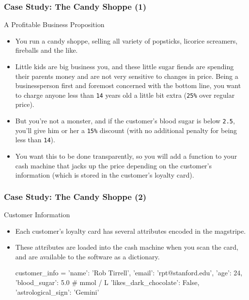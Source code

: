 \documentclass[10pt]{beamer}
\begin{document}
\begin{frame}
  \frametitle{Case Study: The Candy Shoppe (1)}
  \begin{block}{A Profitable Business Proposition}
    \begin{itemize}
      \item You run a candy shoppe, selling all variety of popsticks, licorice screamers, fireballs and the like.
      \item Little kids are big business you, and these little sugar fiends are spending their parents money and are not very sensitive to changes in price.
        Being a businessperson first and foremost concerned with the bottom line, you want to charge anyone less than \texttt{14} years old a little bit extra (\texttt{25\%} over regular price).
      \item But you're not a monster, and if the customer's blood sugar is below \texttt{2.5}, you'll give him or her a \texttt{15\%} discount (with no additional penalty for being less than \texttt{14}).
      \item You want this to be done transparently, so you will add a function to your cash machine that jacks up the price depending on the customer's information (which is stored in the customer's loyalty card).
    \end{itemize}
  \end{block}
\end{frame}

\begin{frame}[fragile]
  \frametitle{Case Study: The Candy Shoppe (2)}
  \begin{block}{Customer Information}
    \begin{itemize}
      \item Each customer's loyalty card has several attributes encoded in the magstripe.
      \item These attributes are loaded into the cash machine when you scan the card, and are available to the software as a dictionary.
        \begin{pythoncode}
  customer_info = {
    'name': 'Rob Tirrell',
    'email': 'rpt@stanford.edu',
    'age': 24,
    'blood_sugar': 5.0 # mmol / L
    'likes_dark_chocolate': False,
    'astrological_sign': 'Gemini'
  }
        \end{pythoncode}
    \end{itemize}
  \end{block}
\end{frame}
\end{document}
